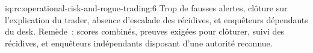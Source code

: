 \begin{solution}{iq:rc:operational-risk-and-rogue-trading:6}
Trop de fausses alertes, clôture sur l'explication du trader, absence d'escalade des récidives, et enquêteurs dépendants du desk. Remède~: scores combinés,
preuves exigées pour clôturer, suivi des récidives, et
enquêteurs indépendants disposant d'une autorité reconnue.
\end{solution}
